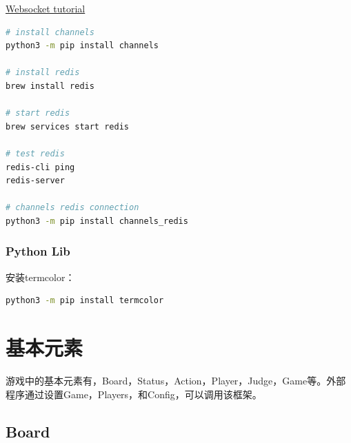 \documentclass[export, 12pt, letterpaper]{ctexrep}
\begin{document}
\href{https://www.youtube.com/watch?v=RVH05S1qab8\&list=PLcWimtlf9naWeyuY5OwQeaRNxvxTRyTCt\&index=1\&t=3148s}{Websocket tutorial}

\begin{lstlisting}[language=Bash]
# install channels
python3 -m pip install channels

# install redis
brew install redis

# start redis
brew services start redis

# test redis
redis-cli ping
redis-server

# channels redis connection
python3 -m pip install channels_redis
\end{lstlisting}

\subsection{Python Lib}

安装termcolor：

\begin{lstlisting}[language=Bash]
python3 -m pip install termcolor
\end{lstlisting}

\chapter{基本元素}


游戏中的基本元素有，Board，Status，Action，Player，Judge，Game等。外部程序通过设置Game，Players，和Config，可以调用该框架。

\section{Board}
\end{document}
